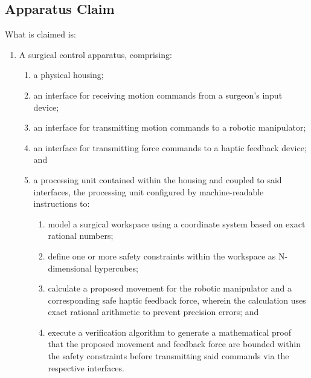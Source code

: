 \documentclass{article}
\begin{document}
\subsection{Apparatus Claim}
\noindent What is claimed is:
\begin{enumerate}
    \item A surgical control apparatus, comprising:
    \begin{enumerate}
        \item[(a)] a physical housing;
        \item[(b)] an interface for receiving motion commands from a surgeon's input device;
        \item[(c)] an interface for transmitting motion commands to a robotic manipulator;
        \item[(d)] an interface for transmitting force commands to a haptic feedback device; and
        \item[(e)] a processing unit contained within the housing and coupled to said interfaces, the processing unit configured by machine-readable instructions to:
        \begin{enumerate}
            \item[(i)] model a surgical workspace using a coordinate system based on exact rational numbers;
            \item[(ii)] define one or more safety constraints within the workspace as N-dimensional hypercubes;
            \item[(iii)] calculate a proposed movement for the robotic manipulator and a corresponding safe haptic feedback force, wherein the calculation uses exact rational arithmetic to prevent precision errors; and
            \item[(iv)] execute a verification algorithm to generate a mathematical proof that the proposed movement and feedback force are bounded within the safety constraints before transmitting said commands via the respective interfaces.
        \end{enumerate}
    \end{enumerate}
\end{enumerate}
\end{document}
